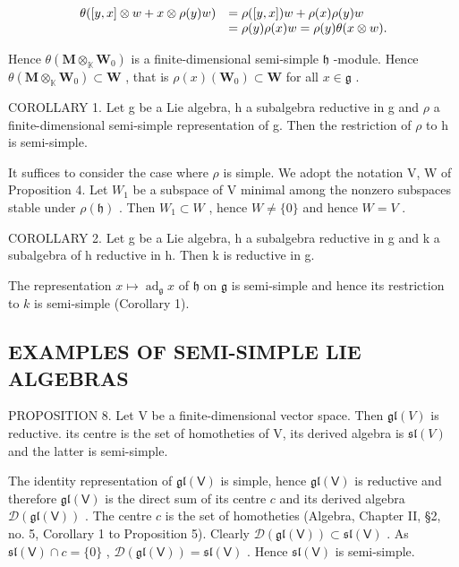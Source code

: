 \[
\begin{array}{r l} \theta ([ y, x ] \otimes w + x \otimes \rho (y) w) & = \rho ([ y, x ]) w + \rho (x) \rho (y) w \\ & = \rho (y) \rho (x) w = \rho (y) \theta (x \otimes w). \end{array}
\]

Hence \(\theta (\mathbf{M}\otimes_{\mathbb{K}}\mathbf{W}_0)\) is a finite-dimensional semi-simple \(\mathfrak{h}\) -module. Hence \(\theta (\mathbf{M}\otimes_{\mathbb{K}}\mathbf{W}_0)\subset \mathbf{W}\) , that is \(\rho (x)(\mathbf{W}_0)\subset \mathbf{W}\) for all \(x\in \mathfrak{g}\) .

COROLLARY 1. Let g be a Lie algebra, h a subalgebra reductive in g and \(\rho\) a finite-dimensional semi-simple representation of g. Then the restriction of \(\rho\) to h is semi-simple.

It suffices to consider the case where \(\rho\) is simple. We adopt the notation V, W of Proposition 4. Let \(W_{1}\) be a subspace of V minimal among the nonzero subspaces stable under \(\rho(\mathfrak{h})\) . Then \(W_{1} \subset W\) , hence \(W \neq \{0\}\) and hence \(W = V\) .

COROLLARY 2. Let g be a Lie algebra, h a subalgebra reductive in g and k a subalgebra of h reductive in h. Then k is reductive in g.

The representation \(x \mapsto \operatorname{ad}_{\mathfrak{g}} x\) of \(\mathfrak{h}\) on \(\mathfrak{g}\) is semi-simple and hence its restriction to \(k\) is semi-simple (Corollary 1).

\subsection{EXAMPLES OF SEMI-SIMPLE LIE ALGEBRAS}

PROPOSITION 8. Let V be a finite-dimensional vector space. Then \(\mathfrak{gl}(V)\) is reductive. its centre is the set of homotheties of V, its derived algebra is \(\mathfrak{sl}(V)\) and the latter is semi-simple.

The identity representation of \(\mathfrak{gl}(\mathsf{V})\) is simple, hence \(\mathfrak{gl}(\mathsf{V})\) is reductive and therefore \(\mathfrak{gl}(\mathsf{V})\) is the direct sum of its centre \(c\) and its derived algebra \(\mathcal{D}(\mathfrak{gl}(\mathsf{V}))\) . The centre \(c\) is the set of homotheties (Algebra, Chapter II, §2, no. 5, Corollary 1 to Proposition 5). Clearly \(\mathcal{D}(\mathfrak{gl}(\mathsf{V})) \subset \mathfrak{sl}(\mathsf{V})\) . As \(\mathfrak{sl}(\mathsf{V}) \cap c = \{0\}\) , \(\mathcal{D}(\mathfrak{gl}(\mathsf{V})) = \mathfrak{sl}(\mathsf{V})\) . Hence \(\mathfrak{sl}(\mathsf{V})\) is semi-simple.

